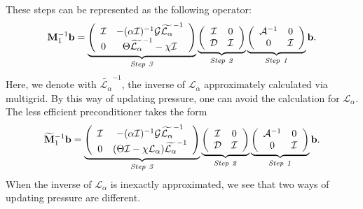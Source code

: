 \documentclass[final]{siamltex}
\def\bb {{\bf b}}
\def\Mb {{\bf M}}
\begin{document}
These steps can be represented as the following operator:
\begin{equation}
\Mb^{-1}_1\bb =
\underbrace{
\left(\begin{array}{cc}
\mathcal{I} & -(\alpha\mathcal{I})^{-1}\mathcal{G} \widetilde{\mathcal{L}_{\alpha}}^{-1} \\
0  & \Theta \widetilde{\mathcal{L}_{\alpha}}^{-1} - \chi\mathcal{I}
\end{array}\right)
}_{\rm{\it Step~3}}
\underbrace{
\left(\begin{array}{cc}
\mathcal{I} & 0\\
\mathcal{D} & \mathcal{I}
\end{array}\right)
}_{\rm{\it Step~2}}
\underbrace{
\left(\begin{array}{cc}
\mathcal{A}^{-1} & 0\\
0 & \mathcal{I}
\end{array}\right)
}_{\rm{\it Step~1}}
\bb.
\end{equation}
Here, we denote with $\widetilde{\mathcal{L}_{\alpha}}^{-1} $, the inverse of $\mathcal{L}_{\alpha}$ approximately 
calculated via multigrid. By this way of updating pressure, one can avoid the calculation for ${\mathcal{L}_{\alpha}}$. 
The less efficient preconditioner takes the form
\begin{equation}
\widetilde{\Mb}_1^{-1}\bb =
\underbrace{
\left(\begin{array}{cc}
\mathcal{I} & -(\alpha\mathcal{I})^{-1}\mathcal{G} \widetilde{\mathcal{L}_\alpha}^{-1}\\
0 & (\Theta\mathcal{I} - \chi\mathcal{L}_\alpha) \widetilde{\mathcal{L}_\alpha}^{-1}
\end{array}\right)
}_{\rm{\it Step~3}}
\underbrace{
\left(\begin{array}{cc}
\mathcal{I} & 0\\
\mathcal{D} & \mathcal{I}
\end{array}\right)
}_{\rm{\it Step~2}}
\underbrace{
\left(\begin{array}{cc}
\mathcal{A}^{-1} & 0\\
0 & \mathcal{I}
\end{array}\right)
}_{\rm{\it Step~1}}
\bb.
\end{equation}
When the inverse of $\mathcal{L}_\alpha$ is inexactly approximated, we see that two ways of updating pressure are different. 
\end{document}
